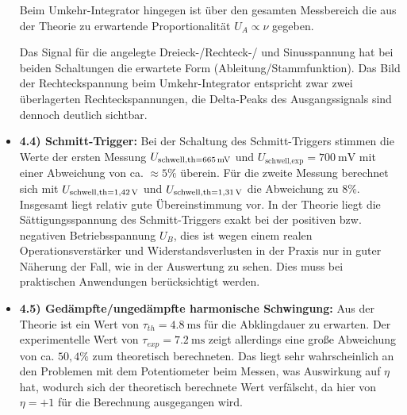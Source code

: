 \documentclass{scrartcl}
\begin{document}
\begin{itemize}
Beim Umkehr-Integrator hingegen ist über den gesamten Messbereich die aus der Theorie zu erwartende Proportionalität $U_A\propto \nu$ gegeben.

Das Signal für die angelegte Dreieck-/Rechteck-/ und Sinusspannung hat bei beiden Schaltungen die erwartete Form (Ableitung/Stammfunktion).
Das Bild der Rechteckspannung beim Umkehr-Integrator entspricht zwar zwei überlagerten Rechteckspannungen, die Delta-Peaks des Ausgangssignals sind dennoch deutlich sichtbar.
\item \textbf{4.4) Schmitt-Trigger:} Bei der Schaltung des Schmitt-Triggers stimmen die Werte der ersten Messung $U_\text{schwell,th=\SI{665}{\milli \volt}}$ und $U_\text{schwell,exp}=\SI{700}{\milli \volt}$ mit einer Abweichung von ca. $≈5\%$ überein.
Für die zweite Messung berechnet sich mit $U_\text{schwell,th=\SI{1,42}{\volt}}$ und $U_\text{schwell,th=\SI{1,31}{\volt}}$ die Abweichung zu $8\%$.
Insgesamt liegt relativ gute Übereinstimmung vor.
In der Theorie liegt die Sättigungsspannung des Schmitt-Triggers exakt bei der positiven bzw. negativen Betriebsspannung $U_B$, dies ist wegen einem realen Operationsverstärker und Widerstandsverlusten in der Praxis nur in guter Näherung der Fall, wie in der Auswertung zu sehen.
Dies muss bei praktischen Anwendungen berücksichtigt werden.
\item \textbf{4.5) Gedämpfte/ungedämpfte harmonische Schwingung:} Aus der Theorie ist ein Wert von $\tau_{th}=\SI{4,8}{\milli \second}$ für die Abklingdauer zu erwarten.
Der experimentelle Wert von $\tau_{exp}=\SI{7,2}{\milli \second}$ zeigt allerdings eine große Abweichung von  ca. $ 50,4\%$ zum theoretisch berechneten.
Das liegt sehr wahrscheinlich an den Problemen mit dem Potentiometer beim Messen, was Auswirkung auf $\eta$ hat, wodurch sich der theoretisch berechnete Wert verfälscht, da hier von $\eta=+1$ für die Berechnung ausgegangen wird.


\end{itemize}
\end{document}
